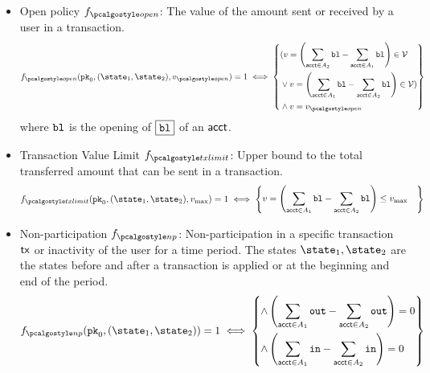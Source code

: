 \begin{itemize}
        \item Open policy $f_{\open}$: The value of the amount sent or received by a user in a transaction.
        \begin{align*}
            f_{\open}(\inpk, (\snap_1, \snap_2), v_{\open}) = 1 \iff 
            \left\{ \begin{aligned}   
            & (v = \left(\sum_{\acct \in A_{2}}\varbl - \sum_{\acct \in A_{1}}\varbl \right)\in \vset \\
            &\lor v = \left(\sum_{\acct \in A_{1}}\varbl - \sum_{\acct \in A_{2}}\varbl \right)\in \vset )\\
            & \land v = v_{\open} 
        \end{aligned} \right\}
        \end{align*}
        where $\textup{\texttt{{bl}}}$ is the opening of $\fbox{$\textup{\texttt{{bl}}}$}$ of an $\textup{\textsf{acct}}$.

        \item Transaction Value Limit $f_{\txnlimit}$: Upper bound to the total transferred amount that can be sent in a transaction.
        \begin{align*}
            f_{\txnlimit}(\inpk, (\snap_1, \snap_2), v_{\max}) = 1 \iff  
            \left\{ \begin{aligned} 
            & v = \left(\sum_{\acct \in A_1}\varbl - \sum_{\acct \in A_2}\varbl \right) \leq v_{\max} 
            \end{aligned} \right\}
        \end{align*}
        
        \item Non-participation $f_{\nonpart}$: Non-participation in a specific transaction $\textup{\textsf{tx}}$ or inactivity of the user for a time period. The states $\snap_1, \snap_2$ are the states before and after a transaction is applied or at the beginning and end of the period.
        \begin{align*}
            f_{\nonpart}(\inpk, (\snap_1, \snap_2)) = 1 \iff  
            \left\{ 
                \begin{aligned} 
                    \land & \left(\sum_{\acct \in A_{1}}\varout - \sum_{\acct \in A_{2}}\varout \right) = 0 \\
                    \land &\left(\sum_{\acct \in A_{1}}\varin - \sum_{\acct \in A_{2}}\varin \right) = 0
                \end{aligned} 
            \right\}
        \end{align*}


\end{itemize}
